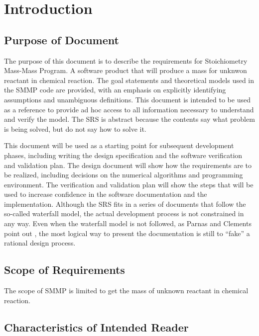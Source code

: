 \documentclass[12pt]{article}
\begin{document}
\newpage


\section{Introduction}

\subsection{Purpose of Document}

The purpose of this document is to describe the requirements for Stoichiometry
Mass-Mass Program. A software product that will produce a mass for unknwon
 reactant in chemical reaction. The goal statements and
theoretical models used in the SMMP code are provided, with an emphasis on
explicitly identifying assumptions and unambiguous definitions. This document is
intended to be used as a reference to provide ad hoc access to all information
necessary to understand and verify the model. The SRS is abstract because the
contents say what problem is being solved, but do not say how to solve it.

This document will be used as a starting point for subsequent development
phases, including writing the design specification and the software verification
and validation plan. The design document will show how the requirements are to
be realized, including decisions on the numerical algorithms and programming
environment. The verification and validation plan will show the steps that will
be used to increase confidence in the software documentation and the
implementation. Although the SRS fits in a series of documents that follow the
so-called waterfall model, the actual development process is not constrained in
any way. Even when the waterfall model is not followed, as Parnas and Clements
point out \cite{Parnas:Clements:1986}, the most logical way to present the
documentation is still to “fake” a rational design process.

\subsection{Scope of Requirements} 

The scope of SMMP is limited to get the mass of unknown reactant in chemical
reaction.

\subsection{Characteristics of Intended Reader} \label{sec_IntendedReader}
\end{document}
